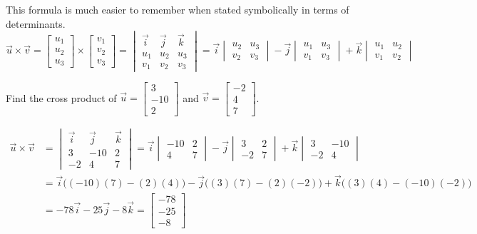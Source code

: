 \documentclass{ximera}
\begin{document}
This formula is much easier to remember when stated symbolically in terms of determinants.
$$\vec{u}\times \vec{v}=\begin{bmatrix}u_1\\u_2\\u_3\end{bmatrix}\times\begin{bmatrix}v_1\\v_2\\v_3\end{bmatrix}=\begin{vmatrix}\vec{i}&\vec{j}&\vec{k}\\u_1&u_2&u_3\\v_1&v_2&v_3\end{vmatrix}=\vec{i}\begin{vmatrix}u_2&u_3\\v_2&v_3\end{vmatrix}-\vec{j}\begin{vmatrix}u_1&u_3\\v_1&v_3\end{vmatrix}+\vec{k}\begin{vmatrix}u_1&u_2\\v_1&v_2\end{vmatrix} $$
 
\begin{example}\label{ex:crossproduct}
Find the cross product of $\vec{u}=\begin{bmatrix}3\\ -10\\ 2\end{bmatrix}$ and $\vec{v}=\begin{bmatrix}-2\\ 4\\ 7\end{bmatrix}$.
\begin{explanation}
\begin{align*}
\vec{u}\times \vec{v}&=
\begin{vmatrix}
\vec{i} & \vec{j} & \vec{k}\\
3 & -10 &2\\
-2 &4 &7
\end{vmatrix} =\vec{i}
\begin{vmatrix}
-10 & 2\\
4 & 7
\end{vmatrix} -\vec{j}
\begin{vmatrix}
3 & 2\\
-2 & 7
\end{vmatrix} +\vec{k}
\begin{vmatrix}
3 & -10\\
-2 & 4
\end{vmatrix}\\
&=\vec{i}\Big((-10)(7)-(2)(4)\Big)-\vec{j}\Big((3)(7)-(2)(-2)\Big)+\vec{k}\Big((3)(4)-(-10)(-2)\Big)\\
&=-78\vec{i}-25\vec{j}-8\vec{k}
=\begin{bmatrix}-78\\ -25\\ -8\end{bmatrix}
\end{align*}
\end{explanation}
\end{example}
 
\end{document}
